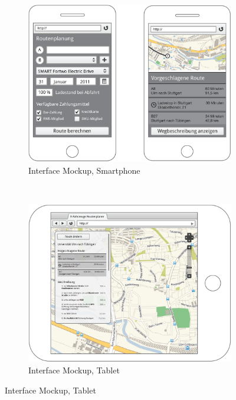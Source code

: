 \documentclass{application}
\begin{document}
\begin{figure}[h]
        \centering
        \begin{subfigure}[b]{0.5\textwidth}
                \centering
	  \includegraphics[scale=0.14]{images/phones}
                \caption{Interface Mockup, Smartphone}
                \label{fig:gull}
        \end{subfigure}%
        ~ 
        \begin{subfigure}[b]{0.5\textwidth}
                \centering
                \includegraphics[scale=0.14]{images/tablet}
                \caption{Interface Mockup, Tablet}
                \label{fig:tiger}
        \end{subfigure}
\end{figure}
\end{document}
